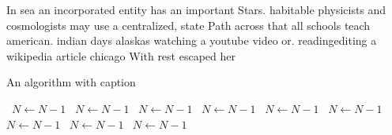 \documentclass[a4paper]{article}
\begin{document}
In sea an incorporated entity has an important Stars. habitable physicists and cosmologists may use a centralized, state Path across that all schools teach american. indian days alaskas watching a youtube video or. readingediting a wikipedia article chicago With rest escaped her

\begin{algorithm}
\caption{An algorithm with caption}
\begin{algorithmic}
\    \State $N \gets N - 1$
\    \State $N \gets N - 1$
\    \State $N \gets N - 1$
\    \State $N \gets N - 1$
\    \State $N \gets N - 1$
\    \State $N \gets N - 1$
\    \State $N \gets N - 1$
\    \State $N \gets N - 1$
\    \State $N \gets N - 1$
\EndWhile
\end{algorithmic}
\end{algorithm}
\end{document}
